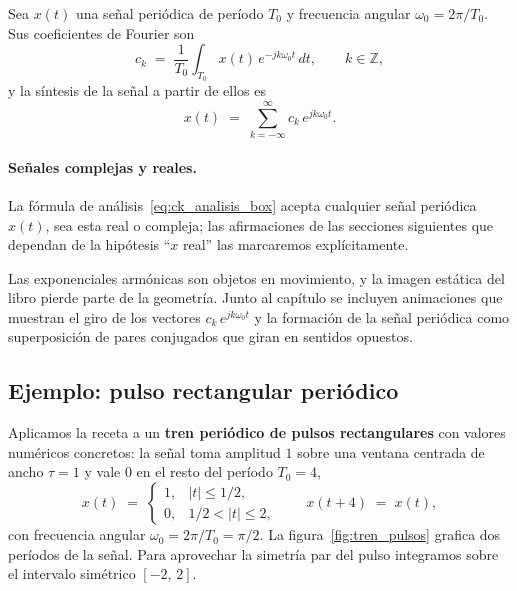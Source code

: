 \documentclass[class=book, crop=false]{standalone}
\begin{document}
\begin{resultado}
Sea $x(t)$ una señal periódica de período $T_0$ y frecuencia angular
$\omega_0 = 2\pi/T_0$. Sus coeficientes de Fourier son
\begin{equation}
    c_k \;=\; \frac{1}{T_0}\int_{T_0} x(t)\,e^{-jk\omega_0 t}\,dt,
    \qquad k \in \mathbb{Z},
    \label{eq:ck_analisis_box}
\end{equation}
y la síntesis de la señal a partir de ellos es
\begin{equation}
    x(t) \;=\; \sum_{k=-\infty}^{\infty} c_k\,e^{jk\omega_0 t}.
    \label{eq:sf_sintesis_box}
\end{equation}
\end{resultado}

\paragraph{Señales complejas y reales.}
La fórmula de análisis~\eqref{eq:ck_analisis_box} acepta
cualquier señal periódica $x(t)$, sea esta real o compleja; las
afirmaciones de las secciones siguientes que dependan de la
hipótesis ``$x$ real'' las marcaremos explícitamente.

\begin{nota}
Las exponenciales armónicas son objetos en movimiento, y la imagen
estática del libro pierde parte de la geometría. Junto al capítulo
se incluyen animaciones que muestran el giro de los vectores
$c_k\,e^{jk\omega_0 t}$ y la formación de la señal periódica como
superposición de pares conjugados que giran en sentidos opuestos.
\end{nota}

\subsection{Ejemplo: pulso rectangular periódico}
\label{subsec:ejemplo_pulso}

Aplicamos la receta a un \textbf{tren periódico de pulsos
rectangulares} con valores numéricos concretos: la señal toma
amplitud $1$ sobre una ventana centrada de ancho $\tau = 1$ y vale
$0$ en el resto del período $T_0 = 4$,
\begin{equation*}
    x(t) \;=\;
    \begin{cases}
        1, & |t| \leq 1/2, \\
        0, & 1/2 < |t| \leq 2,
    \end{cases}
    \qquad
    x(t + 4) \;=\; x(t),
\end{equation*}
con frecuencia angular $\omega_0 = 2\pi/T_0 = \pi/2$. La
figura~\ref{fig:tren_pulsos} grafica dos períodos de la señal. Para
aprovechar la simetría par del pulso integramos sobre el intervalo
simétrico $[-2,\,2]$.
\end{document}
